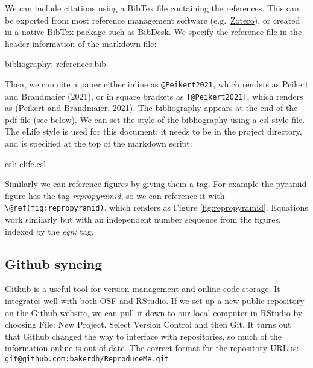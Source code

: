 \documentclass[
]{article}
\newenvironment{Shaded}{\begin{snugshade}}{\end{snugshade}}
\newcommand{\NormalTok}[1]{#1}
\newcommand{\SpecialCharTok}[1]{\textcolor[rgb]{0.00,0.00,0.00}{#1}}
\begin{document}
We can include citations using a BibTex file containing the references. This can be exported from most reference management software (e.g.~\href{https://www.zotero.org/}{Zotero}), or created in a native BibTex package such as \href{https://bibdesk.sourceforge.io/}{BibDesk}. We specify the reference file in the header information of the markdown file:

\begin{Shaded}
\begin{Highlighting}[]
\NormalTok{bibliography}\SpecialCharTok{:}\NormalTok{ references.bib}
\end{Highlighting}
\end{Shaded}

Then, we can cite a paper either inline as \texttt{@Peikert2021}, which renders as Peikert and Brandmaier (2021), or in square brackets as \texttt{{[}@Peikert2021{]}}, which renders as (Peikert and Brandmaier, 2021). The bibliography appears at the end of the pdf file (see below). We can set the style of the bibliography using a csl style file. The eLife style is used for this document; it needs to be in the project directory, and is specified at the top of the markdown script:

\begin{Shaded}
\begin{Highlighting}[]
\NormalTok{csl}\SpecialCharTok{:}\NormalTok{ elife.csl}
\end{Highlighting}
\end{Shaded}

Similarly we can reference figures by giving them a tag. For example the pyramid figure has the tag \emph{repropyramid}, so we can reference it with \texttt{\textbackslash{}@ref(fig:repropyramid)}, which renders as Figure \ref{fig:repropyramid}. Equations work similarly but with an independent number sequence from the figures, indexed by the \emph{eqn:} tag.

\hypertarget{github-syncing}{%
\subsection{Github syncing}\label{github-syncing}}

Github is a useful tool for version management and online code storage. It integrates well with both OSF and RStudio. If we set up a new public repository on the Github website, we can pull it down to our local computer in RStudio by choosing File: New Project. Select Version Control and then Git. It turns out that Github changed the way to interface with repositories, so much of the information online is out of date. The correct format for the repository URL is: \texttt{git@github.com:bakerdh/ReproduceMe.git}
\end{document}

